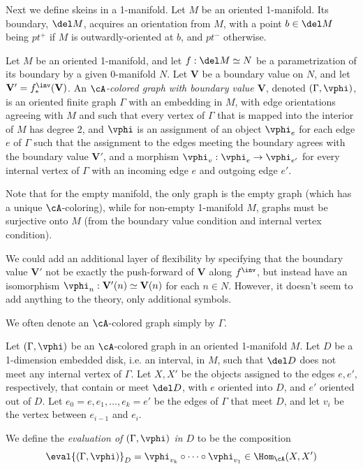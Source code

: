 \documentclass[12pt]{article}
\newcommand{\VV}{{\mathbf{V}}}
\begin{document}
Next we define skeins in a 1-manifold.
Let $M$ be an oriented 1-manifold.
Its boundary, $\del M$, acquires an orientation from $M$,
with a point $b \in \del M$ being $pt^+$ if $M$
is outwardly-oriented at $b$, and $pt^-$ otherwise.

\begin{definition}
\label{d:A-colored-graph}
Let $M$ be an oriented 1-manifold,
and let $f: \del M \simeq N$
be a parametrization of its boundary by a given 0-manifold $N$.
Let $\VV$ be a boundary value on $N$,
and let $\VV' = f_*^\inv(\VV)$.
An \emph{$\cA$-colored graph with boundary value $\VV$},
denoted $(\Gamma,\vphi)$,
is an oriented finite graph $\Gamma$ with an embedding in $M$,
with edge orientations agreeing with $M$
and such that every vertex of $\Gamma$
that is mapped into the interior of $M$ has degree 2,
and $\vphi$ is an assignment of an object $\vphi_e$
for each edge $e$ of $\Gamma$
such that the assignment to the edges meeting the boundary
agrees with the boundary value $\VV'$,
and a morphism $\vphi_v: \vphi_e \to \vphi_{e'}$
for every internal vertex of $\Gamma$
with an incoming edge $e$ and outgoing edge $e'$.
\end{definition}

Note that for the empty manifold, the only graph is the empty graph
(which has a unique $\cA$-coloring),
while for non-empty 1-manifold $M$,
graphs must be surjective onto $M$
(from the boundary value condition and internal vertex condition).

\begin{remark}
We could add an additional layer of flexibility
by specifying that the boundary value $\VV'$
not be exactly the push-forward of $\VV$ along $f^\inv$,
but instead have an isomorphism
$\vphi_n : \VV'(n) \simeq \VV(n)$ for each $n \in N$.
However, it doesn't seem to add anything to the theory,
only additional symbols.
\end{remark}

We often denote an $\cA$-colored graph simply by $\Gamma$.

\begin{definition}
\label{d:local-ev}
Let $(\Gamma,\vphi)$ be an $\cA$-colored graph
in an oriented 1-manifold $M$.
Let $D$ be a 1-dimension embedded disk, i.e. an interval,
in $M$, such that $\del D$ does not meet any internal vertex
of $\Gamma$.
Let $X,X'$ be the objects assigned to the edges $e,e'$,
respectively, that contain or meet $\del D$,
with $e$ oriented into $D$, and $e'$ oriented out of $D$.
Let $e_0 = e, e_1,\ldots,e_k = e'$ be the edges
of $\Gamma$ that meet $D$, and let
$v_i$ be the vertex between $e_{i-1}$ and $e_i$.

We define the \emph{evaluation of $(\Gamma,\vphi)$ in $D$}
to be the composition
\[
\eval{(\Gamma,\vphi)}_D
= \vphi_{v_k} \circ \cdots \circ \vphi_{v_1}
\in \Hom_\cA(X,X')
\]
\end{definition}
\end{document}
